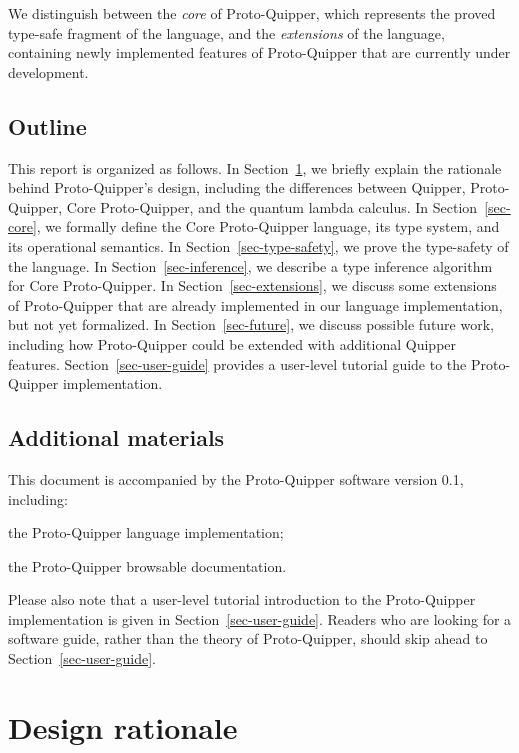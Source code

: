 \documentclass[twoside]{article}
\begin{document}
We distinguish between the \emph{core} of Proto-Quipper, which 
represents the proved type-safe fragment of the language, and 
the \emph{extensions} of the language, containing newly 
implemented features of Proto-Quipper that are currently under 
development. 

\subsection{Outline}

This report is organized as follows. In Section~\ref{sec-design}, we
briefly explain the rationale behind Proto-Quipper's design, including
the differences between Quipper, Proto-Quipper, Core Proto-Quipper,
and the quantum lambda calculus. In Section~\ref{sec-core}, we
formally define the Core Proto-Quipper language, its type system, and
its operational semantics. In Section~\ref{sec-type-safety}, we prove
the type-safety of the language. In Section~\ref{sec-inference}, we
describe a type inference algorithm for Core Proto-Quipper. In
Section~\ref{sec-extensions}, we discuss some extensions of
Proto-Quipper that are already implemented in our language
implementation, but not yet formalized. In Section~\ref{sec-future},
we discuss possible future work, including how Proto-Quipper could be
extended with additional Quipper features.
Section~\ref{sec-user-guide} provides a user-level tutorial guide to
the Proto-Quipper implementation.

\subsection{Additional materials}

This document is accompanied by the Proto-Quipper software version
0.1, including:
\begin{compactitemize}
\item the Proto-Quipper language implementation;
\item the Proto-Quipper browsable documentation.
\end{compactitemize}

Please also note that a user-level tutorial introduction to the
Proto-Quipper implementation is given in
Section~\ref{sec-user-guide}. Readers who are looking for a software
guide, rather than the theory of Proto-Quipper, should skip ahead to
Section~\ref{sec-user-guide}.

\clearpage
\section{Design rationale}\label{sec-design}
\end{document}
